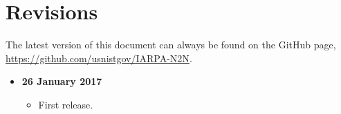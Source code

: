 \section*{Revisions}
\label{sec:revisions}
The latest version of this document can always be found on the GitHub page, \url{https://github.com/usnistgov/IARPA-N2N}.

\begin{itemize}
	\item \textbf{26 January 2017}
	\begin{itemize}
		\item First release.
	\end{itemize}
\end{itemize}

